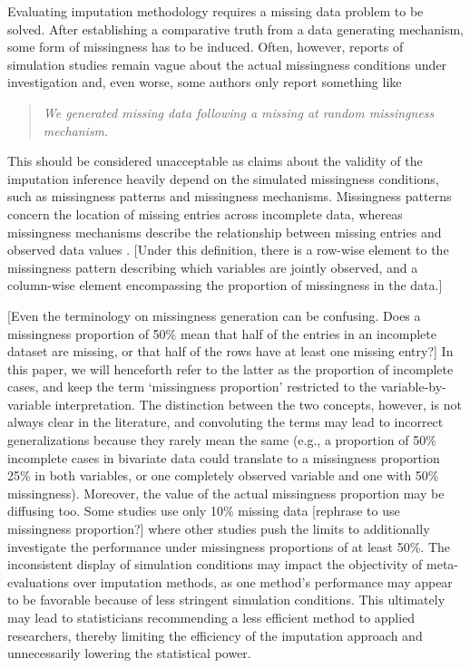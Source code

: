 \documentclass[bimj,fleqn]{w-art}
\begin{document}
Evaluating imputation methodology requires a missing data problem to be solved. After establishing a comparative truth from a data generating mechanism, some form of missingness has to be induced. Often, however, reports of simulation studies remain vague about the actual missingness conditions under investigation and, even worse, some authors only report something like
\begin{quote}
\textit{We generated missing data following a missing at random missingness mechanism.}
\end{quote}
This should be considered unacceptable as claims about the validity of the imputation inference heavily depend on the simulated missingness conditions, such as missingness patterns and missingness mechanisms. Missingness patterns concern the location of missing entries across incomplete data, whereas missingness mechanisms describe the relationship between missing entries and observed data values \citep[][p. 8]{litt20}. [Under this definition, there is a row-wise element to the missingness pattern describing which variables are jointly observed, and a column-wise element encompassing the proportion of missingness in the data.]

[Even the terminology on missingness generation can be confusing. Does a missingness proportion of 50\% mean that half of the entries in an incomplete dataset are missing, or that half of the rows have at least one missing entry?] In this paper, we will henceforth refer to the latter as the proportion of incomplete cases, and keep the term `missingness proportion' restricted to the variable-by-variable interpretation. The distinction between the two concepts, however, is not always clear in the literature, and convoluting the terms may lead to incorrect generalizations because they rarely mean the same (e.g., a proportion of 50\% incomplete cases in bivariate data could translate to a missingness proportion 25\% in both variables, or one completely observed variable and one with 50\% missingness). Moreover, the value of the actual missingness proportion may be diffusing too. Some studies use only 10\% missing data [rephrase to use missingness proportion?] where other studies push the limits to additionally investigate the performance under missingness proportions of at least 50\%. The inconsistent display of simulation conditions may impact the objectivity of meta-evaluations over imputation methods, as one method's performance may appear to be favorable because of less stringent simulation conditions. This ultimately may lead to statisticians recommending a less efficient method to applied researchers, thereby limiting the efficiency of the imputation approach and unnecessarily lowering the statistical power.
\end{document}
